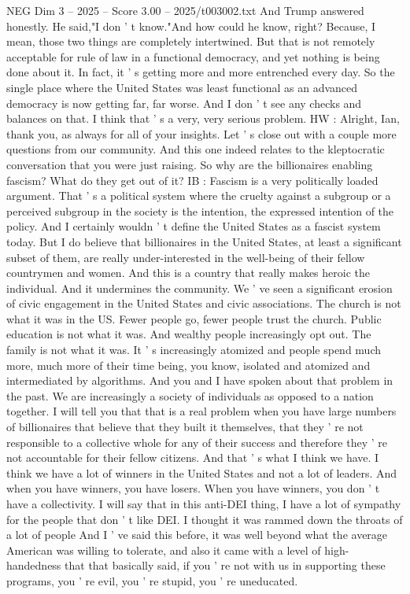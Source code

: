 \begin{textsample}{NEG Dim 3 – 2025 – Score 3.00 – 2025/t003002.txt}
And Trump answered honestly.
He said,"I don ' t know."And how could he know, right?
Because, I mean, those two things are completely intertwined.
But that is not remotely acceptable for rule of law in a functional democracy, and yet nothing is being done about it.
In fact, it ' s getting more and more entrenched every day.
So the single place where the United States was least functional as an advanced democracy is now getting far, far worse.
And I don ' t see any checks and balances on that.
I think that ' s a very, very serious problem.
HW : Alright, Ian, thank you, as always for all of your insights.
Let ' s close out with a couple more questions from our community.
And this one indeed relates to the kleptocratic conversation that you were just raising.
So why are the billionaires enabling fascism?
What do they get out of it?
IB : Fascism is a very politically loaded argument.
That ' s a political system where the cruelty against a subgroup or a perceived subgroup in the society is the intention, the expressed intention of the policy.
And I certainly wouldn ' t define the United States as a fascist system today.
But I do believe that billionaires in the United States, at least a significant subset of them, are really under-interested in the well-being of their fellow countrymen and women.
And this is a country that really makes heroic the individual.
And it undermines the community.
We ' ve seen a significant erosion of civic engagement in the United States and civic associations.
The church is not what it was in the US.
Fewer people go, fewer people trust the church.
Public education is not what it was.
And wealthy people increasingly opt out.
The family is not what it was.
It ' s increasingly atomized and people spend much more, much more of their time being, you know, isolated and atomized and intermediated by algorithms.
And you and I have spoken about that problem in the past.
We are increasingly a society of individuals as opposed to a nation together.
I will tell you that that is a real problem when you have large numbers of billionaires that believe that they built it themselves, that they ' re not responsible to a collective whole for any of their success and therefore they ' re not accountable for their fellow citizens.
And that ' s what I think we have.
I think we have a lot of winners in the United States and not a lot of leaders.
And when you have winners, you have losers.
When you have winners, you don ' t have a collectivity.
I will say that in this anti-DEI thing, I have a lot of sympathy for the people that don ' t like DEI.
I thought it was rammed down the throats of a lot of people And I ' ve said this before, it was well beyond what the average American was willing to tolerate, and also it came with a level of high-handedness that that basically said, if you ' re not with us in supporting these programs, you ' re evil, you ' re stupid, you ' re uneducated.

\end{textsample}
